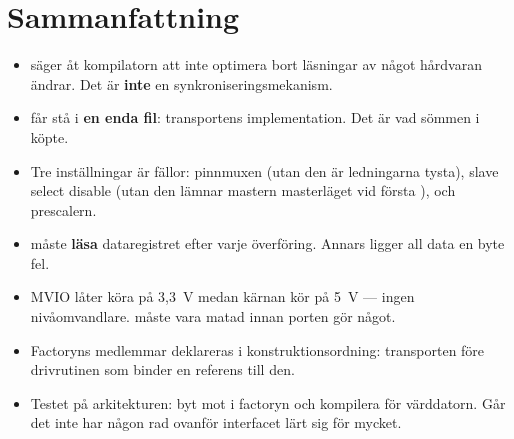 \section*{Sammanfattning}

\begin{itemize}
  \item {} säger åt kompilatorn att inte optimera bort läsningar av något hårdvaran
    ändrar. Det är \textbf{inte} en synkroniseringsmekanism.
  \item {} får stå i \textbf{en enda fil}: transportens implementation. Det är vad
    sömmen i  köpte.
  \item Tre inställningar är fällor: pinnmuxen (utan den är ledningarna tysta), slave select
    disable (utan den lämnar mastern masterläget vid första ), och prescalern.
  \item {} måste \textbf{läsa} dataregistret efter varje överföring. Annars ligger
    all data en byte fel.
  \item MVIO låter  köra på 3,3~V medan kärnan kör på 5~V --- ingen nivåomvandlare.
     måste vara matad innan porten gör något.
  \item Factoryns medlemmar deklareras i konstruktionsordning: transporten före drivrutinen som
    binder en referens till den.
  \item Testet på arkitekturen: byt  mot  i factoryn och kompilera för
    värddatorn. Går det inte har någon rad ovanför interfacet lärt sig för mycket.
\end{itemize}
